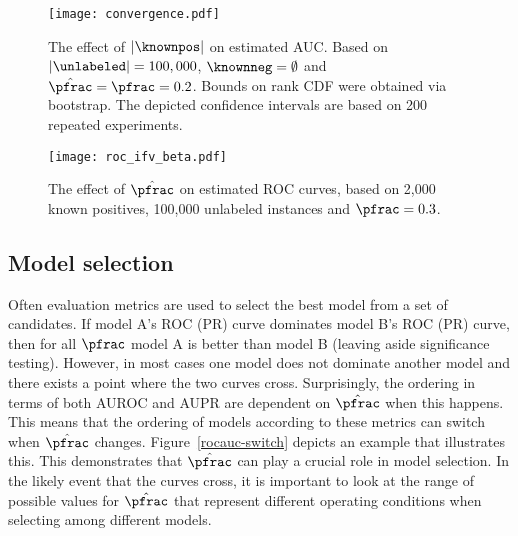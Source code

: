 \begin{figure}[!h]
	\centering
	\texttt{[image: convergence.pdf]}
	\vfill	
	\caption{The effect of $|\knownpos|$ on estimated AUC. Based on $|\unlabeled| = 100,000$, $\knownneg=\emptyset$ and $\hat{\pfrac}=\pfrac=0.2$. Bounds on rank CDF were obtained via bootstrap. The depicted confidence intervals are based on 200 repeated experiments.}
	\label{fig:convergence}
\end{figure}
\begin{figure}[!h]
	\centering
	\centering
	\texttt{[image: roc\_ifv\_beta.pdf]}
	\vfill
	\caption{The effect of $\hat{\pfrac}$ on estimated ROC curves, based on 2,000 known positives, 100,000 unlabeled instances and $\pfrac=0.3$.}
	\label{fig:roc-ifv-beta}
\end{figure}


\subsection{Model selection}
Often evaluation metrics are used to select the best model from a set of candidates. If model A's ROC (PR) curve dominates model B's ROC (PR) curve, then for all $\pfrac$ model A is better than model B (leaving aside significance testing). However, in most cases one model does not dominate another model and there exists a point where the two curves cross. Surprisingly, the ordering in terms of both AUROC and AUPR are dependent on $\hat{\pfrac}$ when this happens. This means that the ordering of models according to these metrics can switch when $\hat{\pfrac}$ changes. Figure~\ref{rocauc-switch} depicts an example that illustrates this. This demonstrates that $\hat{\pfrac}$ can play a crucial role in model selection. In the likely event that the curves cross, it is important to look at the range of possible values for $\hat{\pfrac}$ that represent different operating conditions when selecting among different models.



